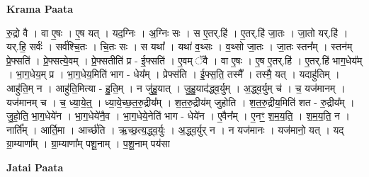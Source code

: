 \documentclass[17pt]{extarticle}
\begin{document}
\textbf{Krama Paata} \newline

रु॒द्रो वै । वा ए॒षः । ए॒ष यत् । यद॒ग्निः । अ॒ग्निः सः । स ए॒तर्.हि॑ । ए॒तर्.हि॑ जा॒तः । जा॒तो यर्.हि॑ । यर्.हि॒ सर्वः॑ । सर्व॑श्चि॒तः । चि॒तः सः । स यथा᳚ । यथा॑ व॒थ्सः । व॒थ्सो जा॒तः । जा॒तः स्तन᳚म् । स्तन॑म् प्रे॒फ्सति॑ । प्रे॒फ्सत्ये॒वम् । प्रे॒फ्सतीति॑ प्र - ई॒फ्सति॑ । ए॒वम् ॅवै । वा ए॒षः । ए॒ष ए॒तर्.हि॑ । ए॒तर्.हि॑ भाग॒धेय᳚म् । भा॒ग॒धेय॒म् प्र । भा॒ग॒धेय॒मिति॑ भाग - धेय᳚म् । प्रेफ्स॑ति । ई॒फ्स॒ति॒ तस्मै᳚ । तस्मै॒ यत् । यदाहु॑तिम् । आहु॑ति॒म् न । आहु॑ति॒मित्या - हु॒ति॒म् । न जु॑हु॒यात् । जु॒हु॒याद॑द्ध्व॒र्युम् । अ॒द्ध्व॒र्युम् च॑ । च॒ यज॑मानम् । यज॑मानम् च । च॒ ध्या॒ये॒त्॒ । ध्या॒ये॒च्छ॒त॒रु॒द्रीय᳚म् । श॒त॒रु॒द्रीय॑म् जुहोति । श॒त॒रु॒द्रीय॒मिति॑ शत - रु॒द्रीय᳚म् । जु॒हो॒ति॒ भा॒ग॒धेये॑न । भा॒ग॒धेये॑नै॒व । भा॒ग॒धेये॒नेति॑ भाग - धेये॑न । ए॒वैन᳚म् । ए॒नꣳ॒॒ श॒म॒य॒ति॒ । श॒म॒य॒ति॒ न । नार्ति᳚म् । आर्ति॒मा । आर्च्छ॑ति । ऋ॒च्छ॒त्य॒द्ध्व॒र्युः । अ॒द्ध्व॒र्युर् न । न यज॑मानः । यज॑मानो॒ यत् । यद् ग्रा॒म्याणा᳚म् । ग्रा॒म्याणा᳚म् पशू॒नाम् । प॒शू॒नाम् पय॑सा \newline

\textbf{Jatai Paata} \newline
\end{document}
